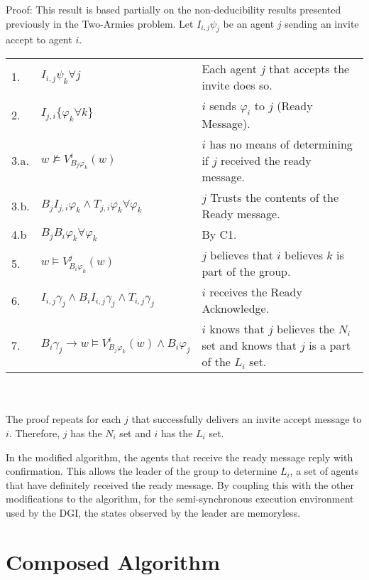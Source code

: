 Proof: This result is based partially on the non-deducibility results presented previously in the Two-Armies problem. Let $I_{i,j} \psi_j$ be an agent $j$ sending an invite accept to agent $i$.

\begin{table}[h!]
\centering
\small
\begin{tabularx}{\linewidth}{l X X}
1. & $I_{i,j} \psi_k \forall j $ & Each agent $j$ that accepts the invite does so.  \\
2. & $I_{j,i} \{ \varphi_k \forall k \}$ & $i$ sends $\varphi_i$ to $j$ (Ready Message). \\
3.a. & $w \not \vDash V_{B_j \varphi_k}^i(w) $ & $i$ has no means of determining if $j$ received the ready message. \\
3.b. & $B_{j}I_{j,i} \varphi_k \wedge T_{j,i} \varphi_k \forall \varphi_k$ & $j$ Trusts the contents of the Ready message. \\
4.b & $B_j B_i \varphi_k \forall \varphi_k$ & By C1. \\
5. & $w \vDash V_{B_i \varphi_k}^j(w)$ & $j$ believes that $i$ believes $k$ is part of the group. \\
6. & $I_{i,j} \gamma_j \wedge B_i I_{i,j} \gamma_j \wedge T_{i,j} \gamma_j$ & $i$ receives the Ready Acknowledge. \\
7. & $B_i \gamma_j \rightarrow w \vDash V_{B_j \varphi_k}^{i}(w) \wedge B_i \varphi_j$ & $i$ knows that $j$ believes the $N_i$ set and knows that $j$ is a part of the $L_i$ set. \\
\end{tabularx} \\~\\
The proof repeats for each $j$ that successfully delivers an invite accept message to $i$. Therefore, $j$ has the $N_i$ set and $i$ has the $L_i$ set.
\label{tab:readylnsetproof}
\end{table}

In the modified algorithm, the agents that receive the ready message reply with confirmation. This allows the leader of the group to determine $L_i$, a set of agents that have definitely received the ready message. By coupling this with the other modifications to the algorithm, for the semi-synchronous execution environment used by the \ac{DGI}, the states observed by the leader are memoryless.

\section{Composed Algorithm}

